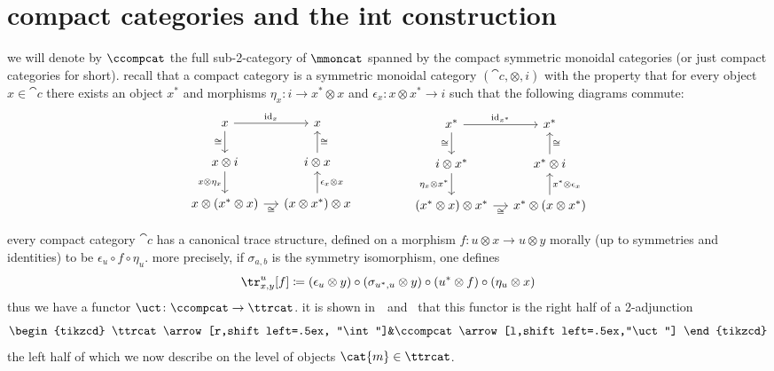 \documentclass[11pt,oneside,article]{memoir}
\begin{document}
\section{compact categories and the int construction}\label{sec:compact_and_int}

we will denote by $\ccompcat$ the full sub-2-category of $\mmoncat$ spanned by the compact symmetric
monoidal categories (or just compact categories for short).  recall that a compact category is a
symmetric monoidal category $(\cat{c},\otimes,i)$ with the property that for every object
$x\in\cat{c}$ there exists an object $x^*$ and morphisms $\eta_x\colon i\to x^*\otimes x$ and
$\epsilon_x\colon x\otimes x^*\to i$ such that the following diagrams commute:
\begin{equation*}
   \begin{tikzcd}[column sep=small]
      x\arrow[r,"\id_x"]\arrow[d,"\cong"'] & x \\
      x\otimes i\arrow[d,"x\otimes\eta_x"'] & i\otimes x\arrow[u,"\cong"'] \\
      x\otimes(x^*\otimes x)\arrow[r,"\cong"'] & (x\otimes x^*)\otimes x\arrow[u,"\epsilon_x\otimes x"']
   \end{tikzcd}
   \hspace{.6in}
   \begin{tikzcd}[column sep=small]
      x^*\arrow[r,"\id_{x^*}"]\arrow[d,"\cong"'] & x^*\\
      i\otimes x^*\arrow[d,"\eta_x\otimes x^*"'] & x^*\otimes i\arrow[u,"\cong"'] \\
      (x^*\otimes x)\otimes x^*\arrow[r,"\cong"'] & x^*\otimes (x\otimes x^*)\arrow[u,"x^*\otimes\epsilon_x"']
   \end{tikzcd}
\end{equation*}

every compact category $\cat{c}$ has a canonical trace structure, defined on a morphism $f\colon
u\otimes x\to u\otimes y$ morally (up to symmetries and identities) to be $\epsilon_u\circ f\circ \eta_u$. more precisely, if
$\sigma_{a,b}$ is the symmetry isomorphism, one defines
\begin{equation*}
   \tr^u_{x,y}[f]\coloneqq(\epsilon_u\otimes y)\circ (\sigma_{u^*,u}\otimes y)\circ (u^*\otimes f)\circ (\eta_u\otimes x)
\end{equation*}
thus we have a functor $\uct\colon\ccompcat\to\ttrcat$. it is shown in~\cite{joyalstreetverity}~and~\cite{hk} that
this functor is the right half of a 2-adjunction
\begin{equation}\label{dia:traced_compact_adjunction}
\begin{tikzcd}
   \ttrcat\arrow[r,shift left=.5ex, "\int"]&\ccompcat\arrow[l,shift left=.5ex,"\uct"]
\end{tikzcd}
\end{equation}
the left half of which we now describe on the level of objects $\cat{m}\in\ttrcat$.
\end{document}
